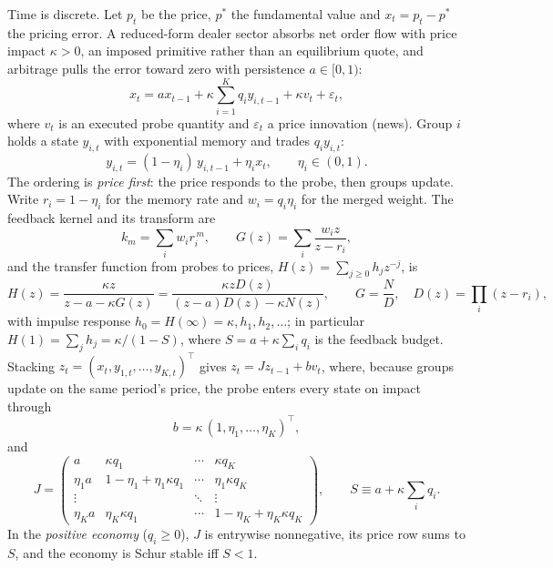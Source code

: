 \documentclass[12pt]{article}
\theoremstyle{definition}
\theoremstyle{remark}
\begin{document}
Time is discrete. Let $p_t$ be the price, $p^*$ the fundamental value and $x_t=p_t-p^*$ the pricing error. A reduced-form dealer sector absorbs net order flow with price impact $\kappa>0$, an imposed primitive rather than an equilibrium quote, and arbitrage pulls the error toward zero with persistence $a\in[0,1)$:
\begin{equation}\label{eq:price}
x_t = a x_{t-1} + \kappa \sum_{i=1}^K q_i y_{i,t-1} + \kappa v_t + \varepsilon_t,
\end{equation}
where $v_t$ is an executed probe quantity and $\varepsilon_t$ a price innovation (news). Group $i$ holds a state $y_{i,t}$ with exponential memory and trades $q_i y_{i,t}$:
\begin{equation}\label{eq:cohort}
y_{i,t} = (1-\eta_i)\,y_{i,t-1} + \eta_i x_t,\qquad \eta_i\in(0,1).
\end{equation}
The ordering is \emph{price first}: the price responds to the probe, then groups update. Write $r_i=1-\eta_i$ for the memory rate and $w_i=q_i\eta_i$ for the merged weight. The feedback kernel and its transform are
\begin{equation}\label{eq:kernel}
k_m=\sum_i w_i r_i^{\,m},\qquad G(z)=\sum_i \frac{w_i z}{z-r_i},
\end{equation}
and the transfer function from probes to prices, $H(z)=\sum_{j\ge0}h_jz^{-j}$, is
\begin{equation}\label{eq:H}
H(z)=\frac{\kappa z}{z-a-\kappa G(z)}=\frac{\kappa zD(z)}{(z-a)D(z)-\kappa N(z)},\qquad G=\frac ND,\quad D(z)=\prod_{i}(z-r_i),
\end{equation}
with impulse response $h_0=H(\infty)=\kappa,h_1,h_2,\ldots$; in particular $H(1)=\sum_jh_j=\kappa/(1-S)$, where $S=a+\kappa\sum_iq_i$ is the feedback budget. Stacking $z_t=(x_t,y_{1,t},\ldots,y_{K,t})^\top$ gives $z_t=Jz_{t-1}+bv_t$, where, because groups update on the same period's price, the probe enters every state on impact through
\begin{equation}\label{eq:b}
b=\kappa\,(1,\eta_1,\ldots,\eta_K)^\top ,
\end{equation}
and
\begin{equation}\label{eq:J}
J=\begin{pmatrix} a & \kappa q_1 & \cdots & \kappa q_K\\ \eta_1 a & 1-\eta_1+\eta_1\kappa q_1 & \cdots & \eta_1\kappa q_K\\ \vdots & & \ddots & \vdots\\ \eta_K a & \eta_K\kappa q_1 & \cdots & 1-\eta_K+\eta_K\kappa q_K\end{pmatrix},\qquad S\equiv a+\kappa\sum_i q_i .
\end{equation}
In the \emph{positive economy} ($q_i\ge0$), $J$ is entrywise nonnegative, its price row sums to $S$, and the economy is Schur stable iff $S<1$.
\end{document}
